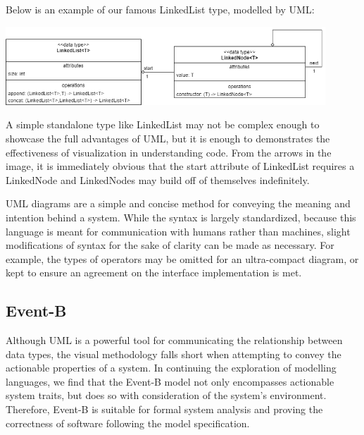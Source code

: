\documentclass{article}
\begin{document}
Below is an example of our famous LinkedList type, modelled by UML:
\begin{center}
    \includegraphics[width=12cm]{linked_list/uml.drawio.png}
\end{center}

A simple standalone type like LinkedList may not be complex enough to showcase the full advantages of UML,
but it is enough to demonstrates the effectiveness of visualization in understanding code.
From the arrows in the image, it is immediately obvious that the start attribute of
LinkedList requires a LinkedNode and LinkedNodes may build off of themselves indefinitely.

UML diagrams are a simple and concise method for conveying the meaning and intention behind a system.
While the syntax is largely standardized, because this language is meant for communication with humans
rather than machines, slight modifications of syntax for the sake of clarity can be made as necessary.
For example, the types of operators may be omitted for an ultra-compact diagram, or kept to ensure an agreement
on the interface implementation is met.

\subsection{Event-B}

Although UML is a powerful tool for communicating the relationship between data types, the visual methodology
falls short when attempting to convey the actionable properties of a system. In continuing the exploration
of modelling languages, we find that the Event-B model not only encompasses actionable system traits, but does
so with consideration of the system's environment. Therefore, Event-B is suitable for formal system analysis
and proving the correctness of software following the model specification.
\end{document}
